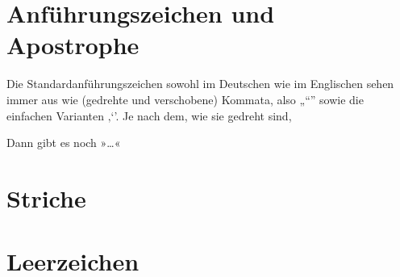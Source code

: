 \lipsum[1]

\section{Anführungszeichen und Apostrophe}

Die Standardanführungszeichen sowohl im Deutschen wie im Englischen sehen immer
aus wie (gedrehte und verschobene) Kommata, also „“” sowie die einfachen
Varianten ‚‘’. Je nach dem, wie sie gedreht sind,

Dann gibt es noch »…«

\section{Striche}

\section{Leerzeichen}

